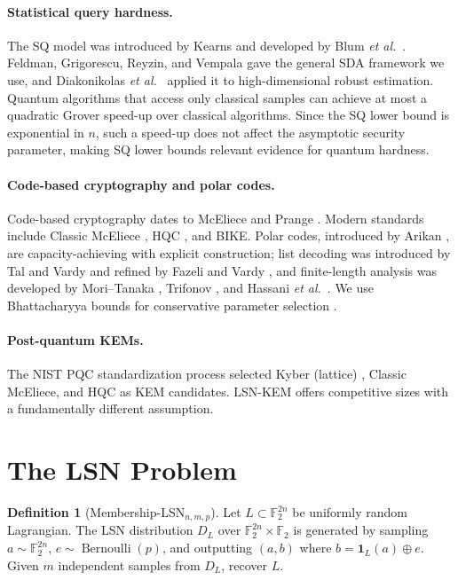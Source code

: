 \documentclass[11pt,a4paper]{article}
\theoremstyle{plain}
\theoremstyle{definition}
\newtheorem{definition}[theorem]{Definition}
\newcommand{\F}{\mathbb{F}}
\newcommand{\etal}{\textit{et al.}}
\begin{document}
\paragraph{Statistical query hardness.}
The SQ model was introduced by Kearns \cite{Kea98} and developed by Blum \etal\ \cite{BFJ+94}. Feldman, Grigorescu, Reyzin, and Vempala \cite{FGR+17} gave the general SDA framework we use, and Diakonikolas \etal\ \cite{DKS17} applied it to high-dimensional robust estimation. Quantum algorithms that access only classical samples can achieve at most a quadratic Grover speed-up over classical algorithms. Since the SQ lower bound is exponential in $n$, such a speed-up does not affect the asymptotic security parameter, making SQ lower bounds relevant evidence for quantum hardness.

\paragraph{Code-based cryptography and polar codes.}
Code-based cryptography dates to McEliece \cite{McE78} and Prange \cite{Pra62}. Modern standards include Classic McEliece \cite{ABD+21}, HQC \cite{AAC+22}, and BIKE. Polar codes, introduced by Arikan \cite{Ari09}, are capacity-achieving with explicit construction; list decoding was introduced by Tal and Vardy \cite{TV15} and refined by Fazeli and Vardy \cite{FV19}, and finite-length analysis was developed by Mori--Tanaka \cite{MT09}, Trifonov \cite{Tri12}, and Hassani \etal\ \cite{HVU14}. We use Bhattacharyya bounds for conservative parameter selection \cite{Sei15}.

\paragraph{Post-quantum KEMs.}
The NIST PQC standardization process \cite{NIS22} selected Kyber (lattice) \cite{SAB+22}, Classic McEliece, and HQC \cite{AAC+22} as KEM candidates. LSN-KEM offers competitive sizes with a fundamentally different assumption.

\section{The LSN Problem}
\label{sec:lsn-problem}

\begin{definition}[Membership-LSN$_{n,m,p}$]
\label{def:lsn}
Let $L \subset \F_2^{2n}$ be uniformly random Lagrangian. The LSN distribution $D_L$ over $\F_2^{2n} \times \F_2$ is generated by sampling $a \sim \F_2^{2n}$, $e \sim \operatorname{Bernoulli}(p)$, and outputting $(a, b)$ where $b = \mathbf{1}_L(a) \oplus e$. Given $m$ independent samples from $D_L$, recover $L$.
\end{definition}
\end{document}
